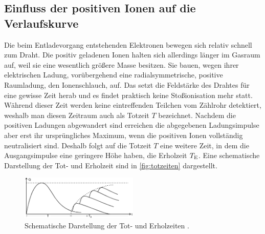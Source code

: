 \subsection{Einfluss der positiven Ionen auf die Verlaufskurve}
\label{subsec:posIon}

Die beim Entladevorgang entstehenden Elektronen bewegen sich relativ schnell zum Draht. Die positiv geladenen Ionen halten sich allerdings länger im Gasraum auf, weil sie eine wesentlich größere Masse besitzen. Sie bauen, wegen ihrer elektrischen Ladung, vorübergehend
eine radialsymmetrische, positive Raumladung, den Ionenschlauch, auf. Das setzt die Feldstärke des Drahtes für eine gewisse Zeit herab und es findet praktisch keine Stoßionisation mehr statt. Während dieser Zeit werden keine eintreffenden Teilchen vom Zählrohr detektiert,
weshalb man diesen Zeitraum auch als Totzeit $T$ bezeichnet. Nachdem die positiven Ladungen abgewandert sind erreichen die abgegebenen Ladungsimpulse aber erst ihr ursprüngliches Maximum, wenn die positiven Ionen vollständig neutralisiert sind.
Deshalb folgt auf die Totzeit $T$ eine weitere Zeit, in dem die Ausgangsimpulse eine geringere Höhe haben, die Erholzeit $T_{\text E}$. Eine schematische Darstellung der Tot- und Erholzeit sind in \autoref{fig:totzeiten} dargestellt.
\begin{figure}[H]
    \centering
    \includegraphics[width=0.5\textwidth]{data/totzeiten.png}
    \caption{Schematische Darstellung der Tot- und Erholzeiten \cite{Anleitung703}.}
    \label{fig:totzeiten}
\end{figure}

